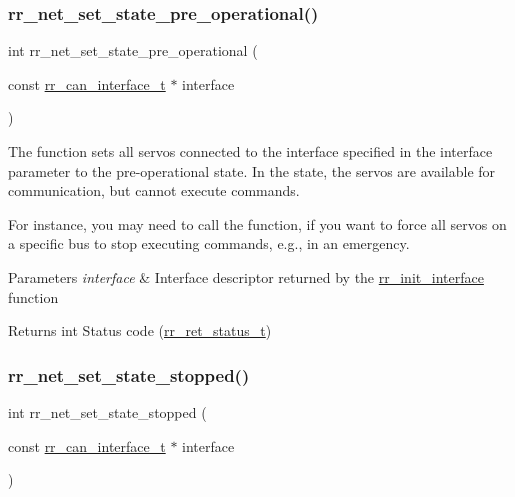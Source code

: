 \subsubsection{\texorpdfstring{rr\+\_\+net\+\_\+set\+\_\+state\+\_\+pre\+\_\+operational()}{rr\_net\_set\_state\_pre\_operational()}}
{\footnotesize\ttfamily int rr\+\_\+net\+\_\+set\+\_\+state\+\_\+pre\+\_\+operational (\begin{DoxyParamCaption}\item[{const \hyperlink{structrr__can__interface__t}{rr\+\_\+can\+\_\+interface\+\_\+t} $\ast$}]{interface }\end{DoxyParamCaption})}



The function sets all servos connected to the interface specified in the \textquotesingle{}interface\textquotesingle{} parameter to the pre-\/operational state. In the state, the servos are available for communication, but cannot execute commands. 

For instance, you may need to call the function, if you want to force all servos on a specific bus to stop executing commands, e.\+g., in an emergency.


\begin{DoxyParams}{Parameters}
{\em interface} & Interface descriptor returned by the \hyperlink{group___init_ga472a4890dcc7d7a13123c56a06946d91}{rr\+\_\+init\+\_\+interface} function \\
\hline
\end{DoxyParams}
\begin{DoxyReturn}{Returns}
int Status code (\hyperlink{api_8h_a92d5be5038abcf89837faf85a08debdc}{rr\+\_\+ret\+\_\+status\+\_\+t}) 
\end{DoxyReturn}
\mbox{\label{group___state_ga7dd178eafeae0d80edd60e3aee6e13b9}} 
\subsubsection{\texorpdfstring{rr\+\_\+net\+\_\+set\+\_\+state\+\_\+stopped()}{rr\_net\_set\_state\_stopped()}}
{\footnotesize\ttfamily int rr\+\_\+net\+\_\+set\+\_\+state\+\_\+stopped (\begin{DoxyParamCaption}\item[{const \hyperlink{structrr__can__interface__t}{rr\+\_\+can\+\_\+interface\+\_\+t} $\ast$}]{interface }\end{DoxyParamCaption})}



